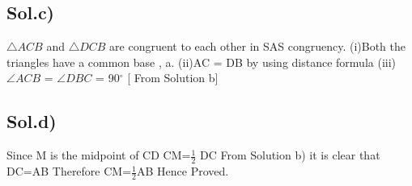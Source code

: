 \documentclass[journal,12pt,onecolumn]{IEEEtran}
\begin{document}
\subsection*{\textbf{Sol.c)}}
\begin{flushleft}
$\triangle ACB$ and $\triangle DCB$ are congruent to each other in SAS congruency.
(i)Both the triangles have a common base , a.
\newline
(ii)AC = DB by using distance formula
\newline
(iii)$\angle ACB$ = $\angle DBC$ = 90$^{\circ}$ [ From Solution b]
\end{flushleft}
\subsection*{\textbf{Sol.d)}}
\begin{flushleft}
Since M is the midpoint of CD
\newline
CM=$\frac{1}{2}$ DC
From Solution b) it is clear that DC=AB
\newline
Therefore CM=$\frac{1}{2}$AB
\newline
Hence Proved.

\end{flushleft}
\end{document}
